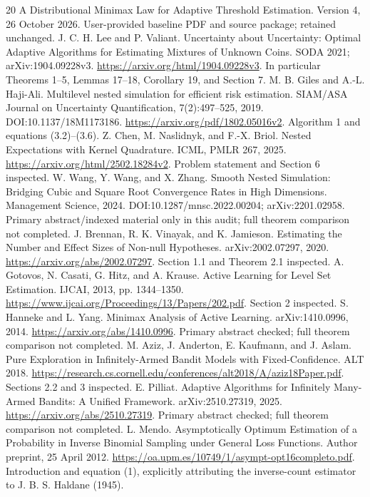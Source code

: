\documentclass[11pt]{article}
\theoremstyle{definition}\newtheorem{conjecture}[theorem]{Conjecture}
\theoremstyle{remark}\newtheorem{remark}[theorem]{Remark}
\begin{document}
\begin{thebibliography}{20}
 A Distributional Minimax Law for Adaptive Threshold Estimation. Version 4, 26 October 2026. User-provided baseline PDF and source package; retained unchanged.
 J. C. H. Lee and P. Valiant. Uncertainty about Uncertainty: Optimal Adaptive Algorithms for Estimating Mixtures of Unknown Coins. SODA 2021; arXiv:1904.09228v3. \url{https://arxiv.org/html/1904.09228v3}. In particular Theorems 1--5, Lemmas 17--18, Corollary 19, and Section 7.
 M. B. Giles and A.-L. Haji-Ali. Multilevel nested simulation for efficient risk estimation. SIAM/ASA Journal on Uncertainty Quantification, 7(2):497--525, 2019. DOI:10.1137/18M1173186. \url{https://arxiv.org/pdf/1802.05016v2}. Algorithm 1 and equations (3.2)--(3.6).
 Z. Chen, M. Naslidnyk, and F.-X. Briol. Nested Expectations with Kernel Quadrature. ICML, PMLR 267, 2025. \url{https://arxiv.org/html/2502.18284v2}. Problem statement and Section 6 inspected.
 W. Wang, Y. Wang, and X. Zhang. Smooth Nested Simulation: Bridging Cubic and Square Root Convergence Rates in High Dimensions. Management Science, 2024. DOI:10.1287/mnsc.2022.00204; arXiv:2201.02958. Primary abstract/indexed material only in this audit; full theorem comparison not completed.
 J. Brennan, R. K. Vinayak, and K. Jamieson. Estimating the Number and Effect Sizes of Non-null Hypotheses. arXiv:2002.07297, 2020. \url{https://arxiv.org/abs/2002.07297}. Section 1.1 and Theorem 2.1 inspected.
 A. Gotovos, N. Casati, G. Hitz, and A. Krause. Active Learning for Level Set Estimation. IJCAI, 2013, pp. 1344--1350. \url{https://www.ijcai.org/Proceedings/13/Papers/202.pdf}. Section 2 inspected.
 S. Hanneke and L. Yang. Minimax Analysis of Active Learning. arXiv:1410.0996, 2014. \url{https://arxiv.org/abs/1410.0996}. Primary abstract checked; full theorem comparison not completed.
 M. Aziz, J. Anderton, E. Kaufmann, and J. Aslam. Pure Exploration in Infinitely-Armed Bandit Models with Fixed-Confidence. ALT 2018. \url{https://research.cs.cornell.edu/conferences/alt2018/A/aziz18Paper.pdf}. Sections 2.2 and 3 inspected.
 E. Pilliat. Adaptive Algorithms for Infinitely Many-Armed Bandits: A Unified Framework. arXiv:2510.27319, 2025. \url{https://arxiv.org/abs/2510.27319}. Primary abstract checked; full theorem comparison not completed.
 L. Mendo. Asymptotically Optimum Estimation of a Probability in Inverse Binomial Sampling under General Loss Functions. Author preprint, 25 April 2012. \url{https://oa.upm.es/10749/1/asympt-opt16completo.pdf}. Introduction and equation (1), explicitly attributing the inverse-count estimator to J. B. S. Haldane (1945).

\end{thebibliography}
\end{document}
